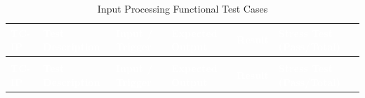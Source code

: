 \begin{longtable}{>{\bfseries}p{1.2cm} p{3.0cm} p{3.5cm} p{4.5cm} p{1.0cm} p{1.5cm}}
\caption{Input Processing Functional Test Cases}
\label{tab:tc-ip} \\
 
\rowcolor{headerblue}
\textcolor{white}{\textbf{TC-IP}} &
\textcolor{white}{\textbf{Test Description}} &
\textcolor{white}{\textbf{Input / Trigger}} &
\textcolor{white}{\textbf{Expected Output}} &
\textcolor{white}{\textbf{Result}} &
\textcolor{white}{\textbf{Stress Test (Pass/Total)}} \\
\endfirsthead
 
\multicolumn{6}{c}{\tablename\ \thetable{} -- continued} \\
\rowcolor{headerblue}
\textcolor{white}{\textbf{TC-IP}} &
\textcolor{white}{\textbf{Test Description}} &
\textcolor{white}{\textbf{Input / Trigger}} &
\textcolor{white}{\textbf{Expected Output}} &
\textcolor{white}{\textbf{Result}} &
\textcolor{white}{\textbf{Stress Test (Pass/Total)}} \\
\endhead
 

\end{longtable}
